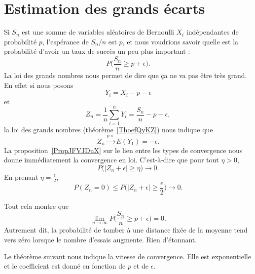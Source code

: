 \section{Estimation des grands écarts}

Si \( S_n\) est une somme de variables aléatoires de Bernoulli \( X_i\) indépendantes de probabilité \( p\), l'espérance de \( S_n/n\) est \( p\), et nous voudrions savoir quelle est la probabilité d'avoir un taux de succès un peu plus important :
\begin{equation}
	P\big( \frac{ S_n }{ n }\geq p+\epsilon \big).
\end{equation}
La loi des grands nombres nous permet de dire que ça ne va pas être très grand. En effet si nous posons
\begin{equation}
	Y_i=X_i-p-\epsilon
\end{equation}
et
\begin{equation}
	Z_n=\frac{1}{ n }\sum_{i=1}^nY_i=\frac{ S_n }{ n }-p-\epsilon,
\end{equation}
la loi des grands nombres (théorème~\ref{ThoefQyKZ}) nous indique que
\begin{equation}
	Z_n\stackrel{p.s.}{\longrightarrow}E(Y_1)=-\epsilon.
\end{equation}
La proposition~\ref{PropJFVJDuX} sur le lien entre les types de convergence nous donne immédiatement la convergence en loi. C'est-à-dire que pour tout \( \eta>0\),
\begin{equation}
	P\Big( | Z_n+\epsilon |\geq \eta \Big)\to 0.
\end{equation}
En prenant \( \eta=\frac{ \epsilon }{2}\),
\begin{equation}
	P(Z_n=0)\leq P\big( | Z_n+\epsilon |\geq \frac{ \epsilon }{2} \big)\to 0.
\end{equation}

Tout cela montre que
\begin{equation}
	\lim_{n\to \infty} P\big( \frac{ S_n }{ n }\geq p+\epsilon \big)=0.
\end{equation}
Autrement dit, la probabilité de tomber à une distance fixée de la moyenne tend vers zéro lorsque le nombre d'essais augmente. Rien d'étonnant.

Le théorème suivant nous indique la vitesse de convergence. Elle est exponentielle et le coefficient est donné en fonction de \( p\) et de \( \epsilon\).

